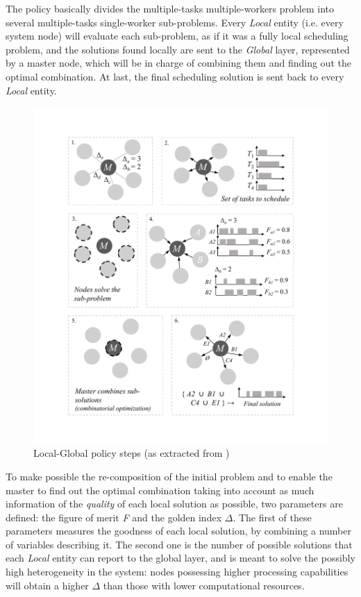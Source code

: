 The policy basically divides the multiple-tasks multiple-workers problem into several multiple-tasks single-worker sub-problems. Every \emph{Local} entity (i.e. every system node) will evaluate each sub-problem, as if it was a fully local scheduling problem, and the solutions found locally are sent to the \emph{Global} layer, represented by a master node, which will be in charge of combining them and finding out the optimal combination. At last, the final scheduling solution is sent back to every \emph{Local} entity.

\begin{figure}[h!]
\centering
\includegraphics[scale=0.3]{Figures/figure_policy_steps.pdf} 
\caption{Local-Global policy steps (as extracted from \cite{Araguz15})}
\label{LGsteps}
\end{figure}

To make possible the re-composition of the initial problem and to enable the master to find out the optimal combination taking into account as much information of the \emph{quality} of each local solution as possible, two parameters are defined: the figure of merit \emph{F} and the golden index $ \Delta $. The first of these parameters measures the goodness of each local solution, by combining a number of variables describing it. The second one is the number of possible solutions that each \emph{Local} entity can report to the global layer, and is meant to solve the possibly high heterogeneity in the system: nodes possessing higher processing capabilities will obtain a higher $ \Delta $ than those with lower computational resources.

